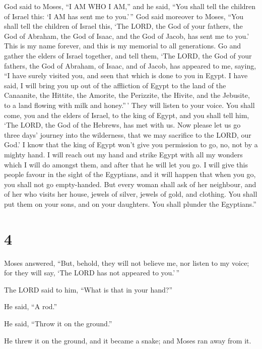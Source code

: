  God said to Moses, ``I AM WHO I AM,'' and he said, ``You
shall tell the children of Israel this: `I AM has sent me to you.'\,''
 God said moreover to Moses, ``You shall tell the children
of Israel this, `The LORD, the God of your fathers, the God of Abraham,
the God of Isaac, and the God of Jacob, has sent me to you.' This is my
name forever, and this is my memorial to all generations. 
Go and gather the elders of Israel together, and tell them, `The LORD,
the God of your fathers, the God of Abraham, of Isaac, and of Jacob, has
appeared to me, saying, ``I have surely visited you, and seen that which
is done to you in Egypt.  I have said, I will bring you up
out of the affliction of Egypt to the land of the Canaanite, the
Hittite, the Amorite, the Perizzite, the Hivite, and the Jebusite, to a
land flowing with milk and honey.''\,'  They will listen to
your voice. You shall come, you and the elders of Israel, to the king of
Egypt, and you shall tell him, `The LORD, the God of the Hebrews, has
met with us. Now please let us go three days' journey into the
wilderness, that we may sacrifice to the LORD, our God.'  I
know that the king of Egypt won't give you permission to go, no, not by
a mighty hand.  I will reach out my hand and strike Egypt
with all my wonders which I will do amongst them, and after that he will
let you go.  I will give this people favour in the sight of
the Egyptians, and it will happen that when you go, you shall not go
empty-handed.  But every woman shall ask of her neighbour,
and of her who visits her house, jewels of silver, jewels of gold, and
clothing. You shall put them on your sons, and on your daughters. You
shall plunder the Egyptians.''

\hypertarget{section-3}{%
\section{4}\label{section-3}}

 Moses answered, ``But, behold, they will not believe me,
nor listen to my voice; for they will say, `The LORD has not appeared to
you.'\,''

 The LORD said to him, ``What is that in your hand?''

He said, ``A rod.''

 He said, ``Throw it on the ground.''

He threw it on the ground, and it became a snake; and Moses ran away
from it.

